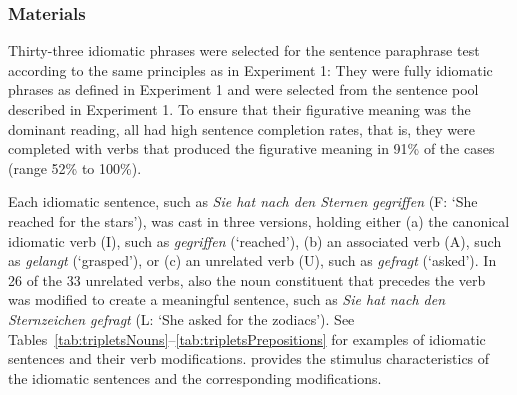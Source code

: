 \documentclass[output=paper]{langsci/langscibook}
\begin{document}
\subsubsection{Materials}
Thirty-three idiomatic phrases were selected for the sentence paraphrase test according to the same principles as in Experiment 1: They were fully idiomatic phrases as defined in Experiment 1 and were selected from the sentence pool described in Experiment 1. To ensure that their figurative meaning was the dominant reading, all had high sentence completion rates, that is, they were completed with verbs that produced the figurative meaning in 91\% of the cases (range 52\% to 100\%).

Each idiomatic sentence, such as \textit{Sie hat nach den Sternen gegriffen} (F: `She reached for the stars'), was cast in three versions, holding either (a) the canonical idiomatic verb (I), such as \textit{gegriffen} (‘reached’), (b) an associated verb (A), such as \textit{gelangt} (‘grasped’), or (c) an unrelated verb (U), such as \textit{gefragt} (‘asked’). In 26 of the 33 unrelated verbs, also the noun constituent that precedes the verb was modified to create a meaningful sentence, such as \textit{Sie hat nach den Sternzeichen gefragt} (L: `She asked for the zodiacs'). See Tables~\ref{tab:tripletsNouns}--\ref{tab:tripletsPrepositions} for examples of idiomatic sentences and their verb modifications.   provides the stimulus characteristics of the idiomatic sentences and the corresponding modifications.

\begin{table}
\caption{Idiomatic sentences and stimulus characteristics of the idiomatic, modified, and unrelated verb constituents in Experiment 2. \textit{Notes:} N = number of items, Lemma = mean lemma frequency per one million, taken from CELEX \citep{baayen:1993}, Closure = mean sentence completion in \%.\label{tab:exp2}}
\end{table}
\end{document}
